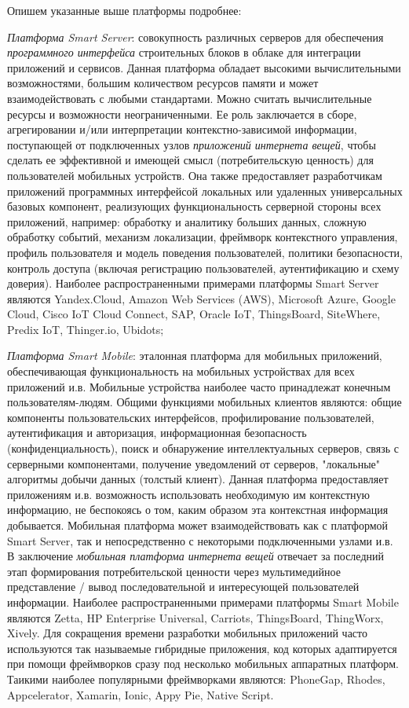 Опишем указанные выше платформы подробнее:
\begin{textitemize}
	\item \textit{Платформа Smart Server}: совокупность различных серверов для обеспечения \textit{программного интерфейса} строительных блоков в облаке для интеграции приложений и сервисов. Данная платформа обладает высокими вычислительными возможностями, большим количеством ресурсов памяти и может взаимодействовать с любыми стандартами. Можно считать вычислительные ресурсы и возможности неограниченными. Ее роль заключается в сборе, агрегировании и/или интерпретации контекстно-зависимой информации, поступающей от подключенных узлов \textit{приложений интернета вещей}, чтобы сделать ее эффективной и имеющей смысл (потребительскую ценность) для пользователей мобильных устройств. Она также предоставляет разработчикам приложений программных интерфейсой локальных или удаленных универсальных базовых компонент, реализующих функциональность серверной стороны всех приложений, например: обработку и аналитику больших данных, сложную обработку событий, механизм локализации, фреймворк контекстного управления, профиль пользователя и модель поведения пользователей, политики безопасности, контроль доступа (включая регистрацию пользователей, аутентификацию и схему доверия). Наиболее распространенными примерами платформы Smart Server являются Yandex.Cloud, Amazon Web Services (AWS), Microsoft Azure, Google Cloud, Cisco IoT Cloud Connect, SAP, Oracle IoT, ThingsBoard, SiteWhere, Predix IoT, Thinger.io, Ubidots;
	\item \textit{Платформа Smart Mobile}: эталонная платформа для мобильных приложений, обеспечивающая функциональность на мобильных устройствах для всех приложений и.в. Мобильные устройства наиболее часто принадлежат конечным пользователям-людям. Общими функциями мобильных клиентов являются: общие компоненты пользовательских интерфейсов, профилирование пользователей, аутентификация и авторизация, информационная безопасность (конфиденциальность), поиск и обнаружение интеллектуальных серверов, связь с серверными компонентами, получение уведомлений от серверов, "локальные"{} алгоритмы добычи данных (толстый клиент). Данная платформа предоставляет приложениям и.в. возможность использовать необходимую им контекстную информацию, не беспокоясь о том, каким образом эта контекстная информация добывается. Мобильная платформа может взаимодействовать как с платформой Smart Server, так и непосредственно с некоторыми подключенными узлами и.в. В заключение \textit{мобильная платформа интернета вещей} отвечает за последний этап формирования потребительской ценности через мультимедийное представление / вывод последовательной и интересующей пользователей информации. Наиболее распространенными примерами платформы Smart Mobile являются Zetta, HP Enterprise Universal, Carriots, ThingsBoard, ThingWorx, Xively. Для сокращения времени разработки мобильных приложений часто используются так называемые гибридные приложения, код которых адаптируется при помощи фреймворков сразу под несколько мобильных аппаратных платформ. Таикими наиболее популярными фреймворками являются: PhoneGap, Rhodes, Appcelerator, Xamarin, Ionic, Appy Pie, Native Script.

\end{textitemize}
